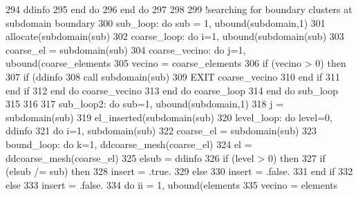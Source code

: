 \begin{DoxyCode}
294           ddinfo%
295 \textcolor{keywordflow}{        end do}
296 \textcolor{keywordflow}{      end do}
297       
298      
299      !searching for boundary clusters at subdomain boundary
300       sub\_loop: \textcolor{keywordflow}{do} sub = 1, ubound(subdomain,1)
301         \textcolor{keyword}{allocate}(subdomain(sub)%
302         coarse\_loop: \textcolor{keywordflow}{do} i=1,  ubound(subdomain(sub)%
303           coarse\_el = subdomain(sub)%
304           coarse\_vecino: \textcolor{keywordflow}{do} j=1, ubound(coarse_elements%
305             vecino = coarse_elements%
306             \textcolor{keywordflow}{if} (vecino > 0) \textcolor{keywordflow}{then}
307               \textcolor{keywordflow}{if} (ddinfo%
308                 \textcolor{keyword}{call }subdomain(sub)%
309                 \textcolor{keywordflow}{EXIT} coarse\_vecino
310 \textcolor{keywordflow}{              end if}
311 \textcolor{keywordflow}{            end if}
312 \textcolor{keywordflow}{          end do} coarse\_vecino
313 \textcolor{keywordflow}{        end do} coarse\_loop
314 \textcolor{keywordflow}{      end do} sub\_loop
315         
316                         
317       sub\_loop2: \textcolor{keywordflow}{do} sub=1, ubound(subdomain,1)
318         j = subdomain(sub)%
319         el\_inserted(subdomain(sub)%
320         level\_loop: \textcolor{keywordflow}{do} level=0, ddinfo%
321           \textcolor{keywordflow}{do} i=1, subdomain(sub)%
322             coarse\_el = subdomain(sub)%
323             bound\_loop: \textcolor{keywordflow}{do} k=1, ddcoarse_mesh(coarse\_el)%
324               el = ddcoarse_mesh(coarse\_el)%
325               elsub = ddinfo%
326               \textcolor{keywordflow}{if} (level > 0) \textcolor{keywordflow}{then}
327                 \textcolor{keywordflow}{if} (elsub /= sub) \textcolor{keywordflow}{then}
328                   insert = .true.
329                 \textcolor{keywordflow}{else}
330                   insert = .false.
331 \textcolor{keywordflow}{                end if}
332               \textcolor{keywordflow}{else}
333                 insert = .false.
334                 \textcolor{keywordflow}{do} ii = 1, ubound(elements%
335                   vecino = elements%

\end{DoxyCode}
